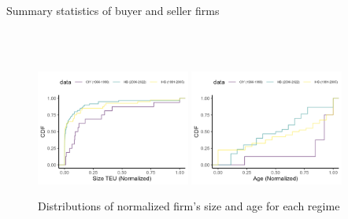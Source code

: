 \documentclass[10pt]{article}
\begin{document}
\begin{table}[!htbp]
  \begin{center}
      \caption{Summary statistics of buyer and seller firms}
      \label{tb:summary_statistics} 
      \subfloat[CIY (1966-1990)]{}\\
      \subfloat[IHS (1991-2005)]{}\\
      \subfloat[HB (2006-2022)]{}
      
  \end{center}\footnotesize
\end{table} 

\begin{figure}[!ht]
\begin{center}
  \includegraphics[width = 0.45\textwidth]
  {figuretable/normalized_size_cdf.png}
  \includegraphics[width = 0.45\textwidth]
  {figuretable/normalized_age_cdf.png}
  \caption{Distributions of normalized firm's size and age for each regime}
  \label{fg:size_cdf}
  \end{center}
\footnotesize
\end{figure}
\end{document}
